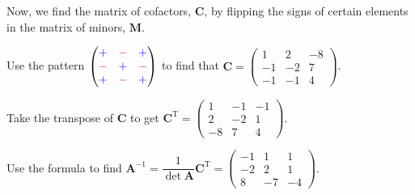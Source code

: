 \documentclass[../main.tex]{subfile}
\begin{document}

Now, we find the matrix of cofactors, $\mathbf{C}$, by flipping the signs of certain elements in the matrix of minors, $\mathbf{M}$.

Use the pattern $\begin{pmatrix}
	\textcolor{blue}{+} & \textcolor{red}{-} & \textcolor{blue}{+}\\
	\textcolor{red}{-} & \textcolor{blue}{+} & \textcolor{red}{-}\\
	\textcolor{blue}{+} & \textcolor{red}{-} & \textcolor{blue}{+}
\end{pmatrix}$ to find that $\mathbf{C} = \begin{pmatrix}1 & 2 & -8\\ -1 & -2 & 7\\ -1 & -1 & 4\end{pmatrix}$.


Take the transpose of $\mathbf{C}$ to get $\mathbf{C}^\text{T} = \begin{pmatrix}1 & -1 & -1\\ 2 & -2 & 1\\ -8 & 7 & 4\end{pmatrix}$.


Use the formula to find $\mathbf{A}^{-1} = \dfrac{1}{\det\mathbf{A}} \mathbf{C}^\text{T} = \begin{pmatrix}-1 & 1 & 1\\ -2 & 2 & 1\\ 8 & -7 & -4\end{pmatrix}$.
\end{document}
